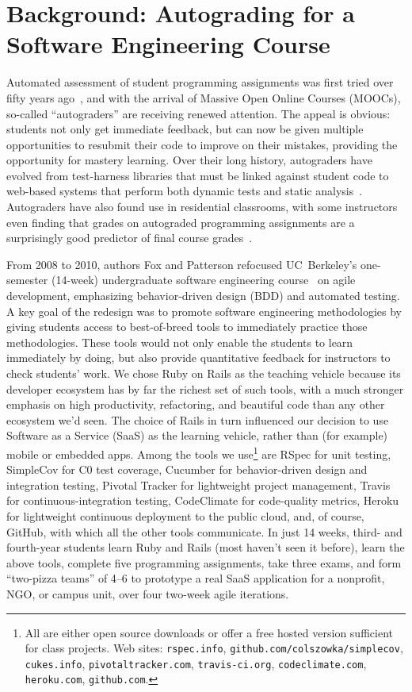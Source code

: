 \section{Background: Autograding for a Software Engineering Course}

Automated assessment of student programming assignments was first tried
over fifty years ago~\cite{hollingsworth60}, and with the arrival of
Massive Open Online Courses (MOOCs), so-called ``autograders'' are
receiving renewed attention.  The appeal is obvious: students not only
get immediate feedback, but can now be given multiple opportunities to
resubmit their code to improve on their mistakes, providing the
opportunity for mastery learning.  Over their long history, autograders
have evolved from test-harness libraries that must be linked against
student code to web-based systems that perform both dynamic tests and static
analysis~\cite{douce-2005-autograding-survey}.  Autograders have also
found use in residential classrooms, with some instructors even finding
that grades on autograded programming assignments are a surprisingly good
predictor of final course grades~\cite{navrat2014}.

From 2008 to 2010, authors Fox and Patterson refocused
UC~Berkeley's one-semester (14-week) undergraduate software engineering
course~\cite{crossing_the_software_chasm,agile_sw_curriculum} on agile
development, emphasizing
behavior-driven design (BDD)
and automated testing.  A key goal
of the redesign
was to promote software engineering methodologies
by giving students access to best-of-breed tools to immediately
practice those methodologies.  These tools would not only enable the
students to learn immediately by doing, but also provide quantitative
feedback for instructors to check students' work.  
We chose Ruby on Rails as the teaching vehicle because its developer
ecosystem has by far the richest set of such tools, with a much stronger
emphasis on high productivity, refactoring, and beautiful code than any
other ecosystem we'd seen.
The choice of Rails in turn influenced our decision to use Software as a
Service (SaaS) as the learning vehicle, rather than (for example) mobile
or embedded apps.
Among the tools we
use\footnote{All are either open source downloads or offer a free
hosted version sufficient for class projects.  Web
sites: \texttt{rspec.info}, \texttt{github.com/colszowka/simplecov},
\texttt{cukes.info}, \texttt{pivotaltracker.com},
\texttt{travis-ci.org}, \texttt{codeclimate.com}, \texttt{heroku.com}, \texttt{github.com}.} 
are 
RSpec for unit testing,
SimpleCov for C0 test coverage,
Cucumber for behavior-driven design and integration testing,
Pivotal Tracker for lightweight project management,
Travis for continuous-integration testing,
CodeClimate for code-quality metrics,
Heroku for lightweight continuous deployment to the public cloud,
and, of course, GitHub, with which all the
other tools communicate.  
In just 14 weeks, third- and fourth-year students learn Ruby
and Rails (most haven't seen it before), learn the above tools, complete
five programming assignments, take three exams, and form ``two-pizza
teams'' of 4--6 to prototype a real SaaS application for a nonprofit,
NGO, or campus unit, over four two-week agile iterations.

